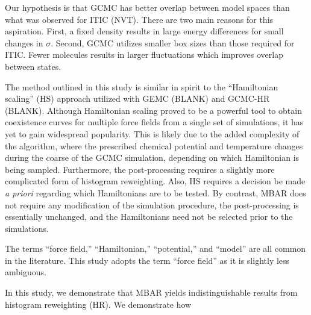 \documentclass[11pt,a4paper]{article}
\begin{document}
Our hypothesis is that GCMC has better overlap between model spaces than what was observed for ITIC (NVT). There are two main reasons for this aspiration. First, a fixed density results in large energy differences for small changes in $\sigma$. Second, GCMC utilizes smaller box sizes than those required for ITIC. Fewer molecules results in larger fluctuations which improves overlap between states.


The method outlined in this study is similar in spirit to the ``Hamiltonian scaling'' (HS) approach utilized with GEMC (BLANK) and GCMC-HR (BLANK). Although Hamiltonian scaling proved to be a powerful tool to obtain coexistence curves for multiple force fields from a single set of simulations, it has yet to gain widespread popularity. This is likely due to the added complexity of the algorithm, where the prescribed chemical potential and temperature changes during the coarse of the GCMC simulation, depending on which Hamiltonian is being sampled. Furthermore, the post-processing requires a slightly more complicated form of histogram reweighting. Also, HS requires a decision be made \textit{a priori} regarding which Hamiltonians are to be tested. By contrast, MBAR does not require any modification of the simulation procedure, the post-processing is essentially unchanged, and the Hamiltonians need not be selected prior to the simulations.

The terms ``force field,'' ``Hamiltonian,'' ``potential,'' and ``model'' are all common in the literature. This study adopts the term ``force field'' as it is slightly less ambiguous.


In this study, we demonstrate that MBAR yields indistinguishable results from histogram reweighting (HR). We demonstrate how 
\end{document}
